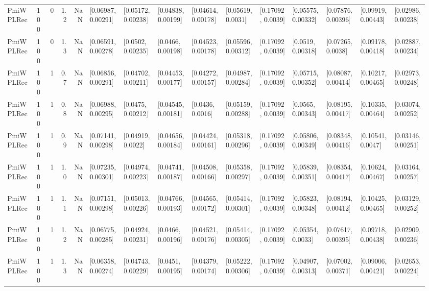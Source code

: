 \begin{tabular}{lllrrllllllllll}
 PmiWPLRec &  100 &     0 &   1.2 &   NaN &  [0.06987, 0.00291] &  [0.05172, 0.00238] &  [0.04838, 0.00199] &  [0.04614, 0.00178] &   [0.05619, 0.0031] &  [0.17092, 0.0039] &  [0.05575, 0.00332] &  [0.07876, 0.00396] &  [0.09919, 0.00443] &  [0.02986, 0.00238] \\
 PmiWPLRec &  100 &     0 &   1.3 &   NaN &  [0.06591, 0.00278] &   [0.0502, 0.00235] &   [0.0466, 0.00198] &  [0.04523, 0.00178] &  [0.05596, 0.00312] &  [0.17092, 0.0039] &   [0.0519, 0.00318] &   [0.07265, 0.0038] &  [0.09178, 0.00418] &  [0.02887, 0.00234] \\
 PmiWPLRec &  100 &     1 &   0.7 &   NaN &  [0.06856, 0.00291] &  [0.04702, 0.00211] &  [0.04453, 0.00177] &  [0.04272, 0.00157] &  [0.04987, 0.00284] &  [0.17092, 0.0039] &  [0.05715, 0.00352] &  [0.08087, 0.00414] &  [0.10217, 0.00465] &  [0.02973, 0.00248] \\
 PmiWPLRec &  100 &     1 &   0.8 &   NaN &  [0.06988, 0.00295] &   [0.0475, 0.00212] &  [0.04545, 0.00181] &    [0.0436, 0.0016] &  [0.05159, 0.00288] &  [0.17092, 0.0039] &   [0.0565, 0.00343] &  [0.08195, 0.00417] &  [0.10335, 0.00464] &  [0.03074, 0.00252] \\
 PmiWPLRec &  100 &     1 &   0.9 &   NaN &  [0.07141, 0.00298] &   [0.04919, 0.0022] &  [0.04656, 0.00184] &  [0.04424, 0.00161] &  [0.05318, 0.00296] &  [0.17092, 0.0039] &  [0.05806, 0.00349] &  [0.08348, 0.00416] &   [0.10541, 0.0047] &  [0.03146, 0.00251] \\
 PmiWPLRec &  100 &     1 &   1.0 &   NaN &  [0.07235, 0.00301] &  [0.04974, 0.00223] &  [0.04741, 0.00187] &  [0.04508, 0.00166] &  [0.05358, 0.00297] &  [0.17092, 0.0039] &  [0.05839, 0.00351] &  [0.08354, 0.00417] &  [0.10624, 0.00467] &  [0.03164, 0.00257] \\
 PmiWPLRec &  100 &     1 &   1.1 &   NaN &  [0.07151, 0.00298] &  [0.05013, 0.00226] &  [0.04766, 0.00193] &  [0.04565, 0.00172] &  [0.05414, 0.00301] &  [0.17092, 0.0039] &  [0.05823, 0.00348] &  [0.08194, 0.00412] &  [0.10425, 0.00465] &  [0.03129, 0.00252] \\
 PmiWPLRec &  100 &     1 &   1.2 &   NaN &  [0.06775, 0.00285] &  [0.04924, 0.00231] &   [0.0466, 0.00196] &  [0.04521, 0.00176] &  [0.05414, 0.00305] &  [0.17092, 0.0039] &   [0.05354, 0.0033] &  [0.07617, 0.00395] &  [0.09718, 0.00438] &  [0.02909, 0.00236] \\
 PmiWPLRec &  100 &     1 &   1.3 &   NaN &  [0.06358, 0.00274] &  [0.04743, 0.00229] &   [0.0451, 0.00195] &  [0.04379, 0.00174] &  [0.05222, 0.00306] &  [0.17092, 0.0039] &  [0.04907, 0.00313] &  [0.07002, 0.00371] &  [0.09006, 0.00421] &  [0.02653, 0.00224] \\

\end{tabular}
